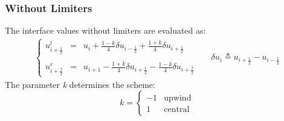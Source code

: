 \documentclass[11pt, a4paper]{article}
\begin{document}
\subsubsection{Without Limiters}
The interface values without limiters are evaluated as:
\begin{equation}
    \begin{matrix}
        \left\{\begin{array}{lcl}
            u_{i+\frac{1}{2}}^l & = & \displaystyle u_i+\frac{1-k}{4}\delta u_{i-\frac{1}{2}}+\frac{1+k}{4}\delta u_{i+\frac{1}{2}} \\\\
            u_{i+\frac{1}{2}}^r & = & \displaystyle u_{i+1}-\frac{1+k}{4}\delta u_{i+\frac{1}{2}}-\frac{1-k}{4}\delta u_{i+\frac{3}{2}}
        \end{array}\right. && \delta u_i\triangleq u_{i+\frac{1}{2}} - u_{i-\frac{1}{2}}
    \end{matrix}
\end{equation}
The parameter \emph{k} determines the scheme:
\begin{equation*}
    k = \left\{\begin{array}{cr}
        -1 & \mathrm{upwind} \\
        1 & \mathrm{central}
    \end{array}\right.
\end{equation*}
\end{document}
